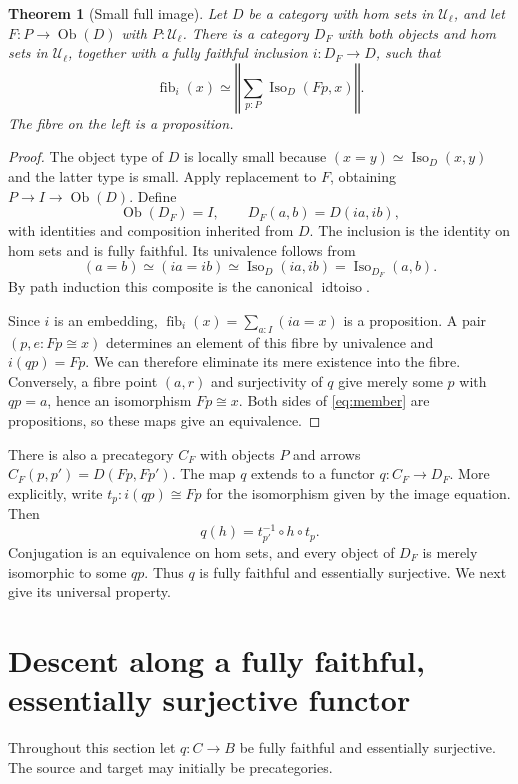 \documentclass[11pt]{amsart}
\newtheorem{theorem}{Theorem}[section]
\theoremstyle{definition}
\theoremstyle{remark}
\newcommand{\UU}{\mathcal U}
\newcommand{\Iso}{\operatorname{Iso}}
\newcommand{\Ob}{\operatorname{Ob}}
\newcommand{\fib}{\operatorname{fib}}
\newcommand{\tr}[1]{\left\Vert #1\right\Vert}
\begin{document}
\begin{theorem}[Small full image]\label{thm:image}
Let $D$ be a category with hom sets in $\UU_\ell$, and let
$F:P\to\Ob(D)$ with $P:\UU_\ell$. There is a category $D_F$ with both
objects and hom sets in $\UU_\ell$, together with a fully faithful
inclusion $i:D_F\to D$, such that
\begin{equation}\label{eq:member}
 \fib_i(x)\simeq
 \tr{\sum_{p:P}\Iso_D(Fp,x)}.
\end{equation}
The fibre on the left is a proposition.
\end{theorem}
\begin{proof}
The object type of $D$ is locally small because
$(x=y)\simeq\Iso_D(x,y)$ and the latter type is small. Apply replacement
to $F$, obtaining $P\to I\to\Ob(D)$. Define
\[
 \Ob(D_F)=I,\qquad D_F(a,b)=D(ia,ib),
\]
with identities and composition inherited from $D$. The inclusion is the
identity on hom sets and is fully faithful. Its univalence follows from
\[
 (a=b)\simeq(ia=ib)\simeq\Iso_D(ia,ib)
                  =\Iso_{D_F}(a,b).
\]
By path induction this composite is the canonical $\operatorname{idtoiso}$.

Since $i$ is an embedding, $\fib_i(x)=\sum_{a:I}(ia=x)$ is a proposition.
A pair $(p,e:Fp\cong x)$ determines an element of this fibre by univalence
and $i(qp)=Fp$. We can therefore eliminate its mere existence into the
fibre. Conversely, a fibre point $(a,r)$ and surjectivity of $q$ give
merely some $p$ with $qp=a$, hence an isomorphism $Fp\cong x$.
Both sides of \eqref{eq:member} are propositions, so these maps give an
equivalence.
\end{proof}

There is also a precategory $C_F$ with objects $P$ and arrows
$C_F(p,p')=D(Fp,Fp')$. The map $q$ extends to a functor
$q:C_F\to D_F$. More explicitly, write
$t_p:i(qp)\cong Fp$ for the isomorphism given by the image equation. Then
\[
 q(h)=t_{p'}^{-1}\circ h\circ t_p.
\]
Conjugation is an equivalence on hom sets, and every object of $D_F$ is
merely isomorphic to some $qp$. Thus $q$ is fully faithful and essentially
surjective. We next give its universal property.

\section{Descent along a fully faithful, essentially surjective functor}

Throughout this section let $q:C\to B$ be fully faithful and essentially
surjective. The source and target may initially be precategories.
\end{document}
